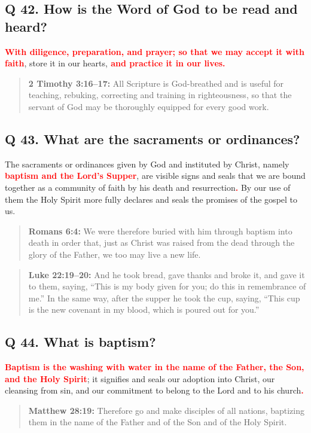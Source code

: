 \documentclass[]{memoir}
\newcommand\Children[1]{\textbf{\textcolor{red}{#1}}}
\newcommand\Quote[2]{\begin{quote}{\textbf{#1:}{ #2}}\end{quote}}
\begin{document}
\subsection{Q 42. How is the Word of God to be read and heard?}
\Children{With diligence, preparation, and prayer; so that we may accept it with faith}, store it in our hearts,\Children{ and practice it in our lives.}

\Quote{2 Timothy 3:16--17}{All Scripture is God-breathed and is useful for teaching, rebuking, correcting and training in righteousness, so that the servant of God may be thoroughly equipped for every good work.}

\subsection{Q 43. What are the sacraments or ordinances?}
The sacraments or ordinances given by God and instituted by Christ, namely \Children{baptism and the Lord's Supper}, are visible signs and seals that we are bound together as a community of faith by his death and resurrection\Children{.} By our use of them the Holy Spirit more fully declares and seals the promises of the gospel to us.

\Quote{Romans 6:4}{We were therefore buried with him through baptism into death in order that, just as Christ was raised from the dead through the glory of the Father, we too may live a new life.}

\Quote{Luke 22:19--20}{And he took bread, gave thanks and broke it, and gave it to them, saying, ``This is my body given for you; do this in remembrance of me.'' In the same way, after the supper he took the cup, saying, ``This cup is the new covenant in my blood, which is poured out for you.''}

\subsection{Q 44. What is baptism?}
\Children{Baptism is the washing with water in the name of the Father, the Son, and the Holy Spirit}; it signifies and seals our adoption into Christ, our cleansing from sin, and our commitment to belong to the Lord and to his church\Children{.}

\Quote{Matthew 28:19}{Therefore go and make disciples of all nations, baptizing them in the name of the Father and of the Son and of the Holy Spirit.}
\end{document}
